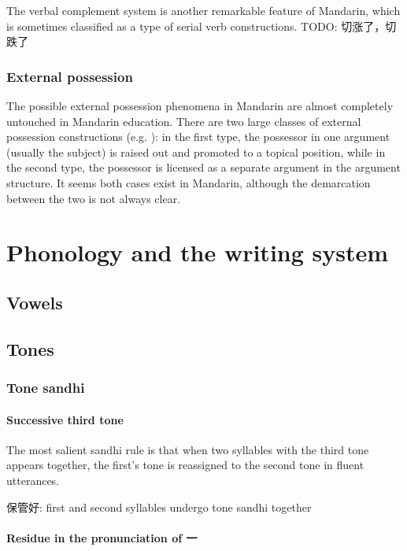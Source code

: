 \documentclass[UTF8, a4paper, oneside, scheme=plain, 12pt]{ctexrep}
\begin{document}
The verbal complement system is another remarkable feature of Mandarin, 
which is sometimes classified as a type of serial verb constructions.
TODO: 切涨了，切跌了

\subsection{External possession}

The possible external possession phenomena in Mandarin are almost completely untouched in Mandarin education.
There are two large classes of external possession constructions 
(e.g. \citealt{tyler2021two}):
in the first type, the possessor in one argument (usually the subject) is raised out 
and promoted to a topical position, 
while in the second type, the possessor is licensed 
as a separate argument in the argument structure.
It seems both cases exist in Mandarin, 
although the demarcation between the two is not always clear.



\chapter{Phonology and the writing system}

\section{Vowels}

\section{Tones}

\subsection{Tone sandhi}\label{sec:phonology.tone-sandhi}

\subsubsection{Successive third tone}\label{sec:phonology.tone-sandhi.third}

The most salient sandhi rule is that 
when two syllables with the third tone appears together, 
the first's tone is reassigned to the second tone in 
fluent utterances. 

保管好: first and second syllables undergo tone sandhi together 

\subsubsection{Residue in the pronunciation of 一}
\end{document}
